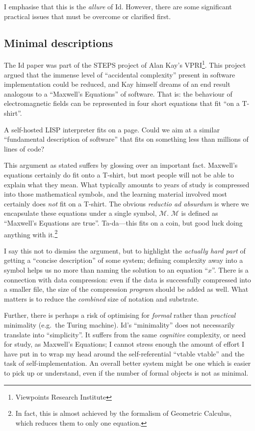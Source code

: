I emphasise that this is the \emph{allure} of Id{}. However, there are
some significant practical issues that must be overcome or clarified
first.

\hypertarget{minimal-descriptions}{%
\subsection{Minimal descriptions}\label{minimal-descriptions}}

The Id{} paper was part of the STEPS project of Alan Kay's
VPRI\footnote{Viewpoints Research Institute}. This project argued that
the immense level of ``accidental complexity'' present in software
implementation could be reduced, and Kay himself dreams of an end result
analogous to a ``Maxwell's Equations'' of software. That is: the
behaviour of electromagnetic fields can be represented in four short
equations that fit ``on a T-shirt''.

A self-hosted LISP interpreter fits on a page. Could we aim at a similar
``fundamental description of software'' that fits on something less than
millions of lines of code?

This argument as stated suffers by glossing over an important fact.
Maxwell's equations certainly do fit onto a T-shirt, but most people
will not be able to explain what they mean. What typically amounts to
years of study is compressed into those mathematical symbols, and the
learning material involved most certainly does \emph{not} fit on a
T-shirt. The obvious \emph{reductio ad absurdum} is where we encapsulate
these equations under a single symbol, \(\mathcal{M}\). \(\mathcal{M}\)
is defined as ``Maxwell's Equations are true''. Ta-da---this fits on a
coin, but good luck doing anything with it.\footnote{In fact, this is
  almost achieved by the formalism of Geometric Calculus, which reduces
  them to only one equation.}

I say this not to dismiss the argument, but to highlight the
\emph{actually hard part} of getting a ``concise description'' of some
system; defining complexity away into a symbol helps us no more than
naming the solution to an equation ``\(x\)''. There is a connection with
data compression: even if the data is successfully compressed into a
smaller file, the size of the compression \emph{program} should be added
as well. What matters is to reduce the \emph{combined} size of notation
and substrate.

Further, there is perhaps a risk of optimising for \emph{formal} rather
than \emph{practical} minimality (e.g.~the Turing machine). Id{}'s
``minimality'' does not necessarily translate into ``simplicity''. It
suffers from the same \emph{cognitive} complexity, or need for study, as
Maxwell's Equations; I cannot stress enough the amount of effort I have
put in to wrap my head around the self-referential ``vtable vtable'' and
the task of self-implementation. An overall better system might be one
which is easier to pick up or understand, even if the number of formal
objects is not as minimal.

